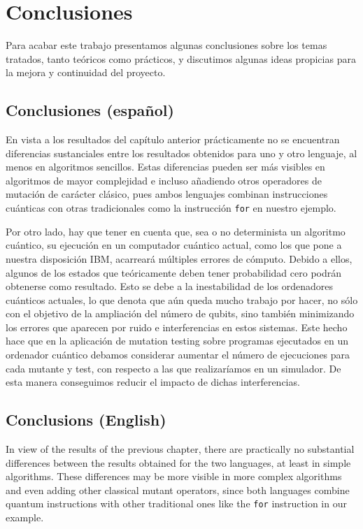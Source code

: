 \chapter{Conclusiones}
Para acabar este trabajo presentamos algunas conclusiones sobre los temas tratados, tanto teóricos como prácticos, y discutimos algunas ideas propicias para la mejora y continuidad del proyecto.
\section{Conclusiones (español)}
En vista a los resultados del capítulo anterior prácticamente no se encuentran diferencias sustanciales entre los resultados obtenidos para uno y otro lenguaje, al menos en algoritmos sencillos. Estas diferencias pueden ser más visibles en algoritmos de mayor complejidad e incluso añadiendo otros operadores de mutación de carácter clásico, pues ambos lenguajes combinan instrucciones cuánticas con otras tradicionales como la instrucción \texttt{for} en nuestro ejemplo.

Por otro lado, hay que tener en cuenta que, sea o no determinista un algoritmo cuántico, su ejecución en un computador cuántico actual, como los que pone a nuestra disposición IBM, acarreará múltiples errores de cómputo. Debido a ellos, algunos de los estados que teóricamente deben tener probabilidad cero podrán obtenerse como resultado. Esto se debe a la inestabilidad de los ordenadores cuánticos actuales, lo que denota que aún queda mucho trabajo por hacer, no sólo con el objetivo de la ampliación del número de qubits, sino también minimizando los errores que aparecen por ruido e interferencias en estos sistemas. Este hecho hace que en la aplicación de mutation testing sobre programas ejecutados en un ordenador cuántico debamos considerar aumentar el número de ejecuciones para cada mutante y test, con respecto a las que realizaríamos en un simulador. De esta manera conseguimos reducir el impacto de dichas interferencias.

\section{Conclusions (English)}
In view of the results of the previous chapter, there are practically no substantial differences between the results obtained for the two languages, at least in simple algorithms. These differences may be more visible in more complex algorithms and even adding other classical mutant operators, since both languages combine quantum instructions with other traditional ones like the \texttt{for} instruction in our example.

